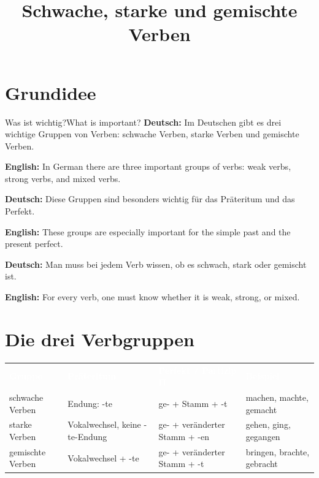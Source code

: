 \documentclass[a4paper,11pt]{article}
\title{Schwache, starke und gemischte Verben}
\date{}
\newcommand{\GermanText}[1]{\textbf{Deutsch: }#1\par}
\newcommand{\EnglishText}[1]{{\small\color{SoftGray}\textbf{English: }#1\par}}
\begin{document}
    \maketitle
    \tableofcontents
    \newpage
    
    
    \section{Grundidee}
        
        \begin{grammarentry}{Was ist wichtig?}{What is important?}
            \GermanText{Im Deutschen gibt es drei wichtige Gruppen von Verben: schwache Verben, starke Verben und gemischte Verben.}
            \EnglishText{In German there are three important groups of verbs: weak verbs, strong verbs, and mixed verbs.}
            
            \GermanText{Diese Gruppen sind besonders wichtig für das Präteritum und das Perfekt.}
            \EnglishText{These groups are especially important for the simple past and the present perfect.}
            
            \GermanText{Man muss bei jedem Verb wissen, ob es schwach, stark oder gemischt ist.}
            \EnglishText{For every verb, one must know whether it is weak, strong, or mixed.}
        \end{grammarentry}
    
    
    \section{Die drei Verbgruppen}
        
        \renewcommand{\arraystretch}{1.35}
        
        \begin{tabular}{>{\raggedright\arraybackslash}p{3.2cm} >{\raggedright\arraybackslash}p{4.2cm} >{\raggedright\arraybackslash}p{4.2cm} >{\raggedright\arraybackslash}p{3.2cm}}
            \rowcolor{HeaderBlueDark}
            \textcolor{white}{\textbf{Gruppe}} &
            \textcolor{white}{\textbf{Präteritum}} &
            \textcolor{white}{\textbf{Perfekt / Partizip II}} &
            \textcolor{white}{\textbf{Beispiel}} \\
            
            \rowcolor{RowBlueLight}
            schwache Verben &
            Endung: -te &
            ge- + Stamm + -t &
            machen, machte, gemacht \\
            
            \rowcolor{RowBlueDark}
            starke Verben &
            Vokalwechsel, keine -te-Endung &
            ge- + veränderter Stamm + -en &
            gehen, ging, gegangen \\
            
            \rowcolor{RowBlueLight}
            gemischte Verben &
            Vokalwechsel + -te &
            ge- + veränderter Stamm + -t &
            bringen, brachte, gebracht \\
        \end{tabular}
    
\end{document}
